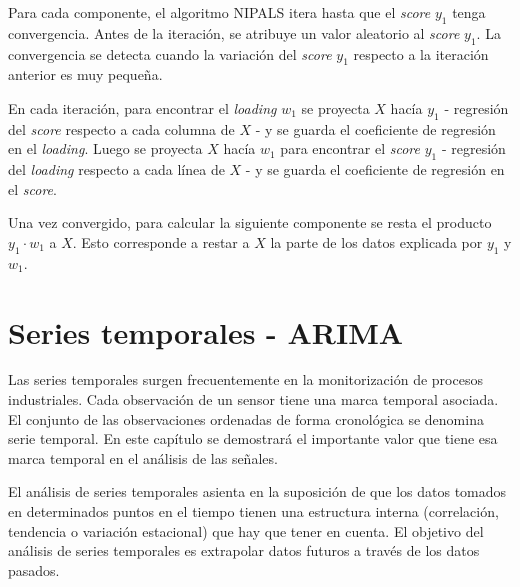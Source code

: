 \documentclass[11pt,spanish,listoffigures,listoftables]{tfgetsinf}
\begin{document}
    Para cada componente, el algoritmo NIPALS itera hasta que el {\em score} \(y_{1}\) tenga convergencia. Antes de la iteración, se atribuye un valor aleatorio al {\em score} \(y_{1}\). La convergencia se detecta cuando la variación del {\em score} \(y_{1}\) respecto a la iteración anterior es muy pequeña. 
    
     En cada iteración, para encontrar el {\em loading} \(w_{1}\) se proyecta \(X\) hacía \(y_{1}\) - regresión del {\em score} respecto a cada columna de \(X\) - y se guarda el coeficiente de regresión en el {\em loading}. Luego se proyecta \(X\) hacía \(w_{1}\) para encontrar el {\em score} \(y_{1}\) - regresión del {\em loading} respecto a cada línea de \(X\) - y se guarda el coeficiente de regresión en el {\em score}. 
    
    Una vez convergido, para calcular la siguiente componente se resta el producto \(y_{1} \cdot w_{1}\) a \(X\). Esto corresponde a restar a \(X\) la parte de los datos explicada por \(y_{1}\) y \(w_{1}\).
    

    \section{Series temporales - ARIMA}
    Las series temporales surgen frecuentemente en la monitorización de procesos industriales. Cada observación de un sensor tiene una marca temporal asociada. El conjunto de las observaciones ordenadas de forma cronológica se denomina serie temporal. En este capítulo se demostrará el importante valor que tiene esa marca temporal en el análisis de las señales. 
    
    El análisis de series temporales asienta en la suposición de que los datos tomados en determinados puntos en el tiempo tienen una estructura interna (correlación, tendencia o variación estacional) que hay que tener en cuenta. El objetivo del análisis de series temporales es extrapolar datos futuros a través de los datos pasados. 
    
\end{document}
